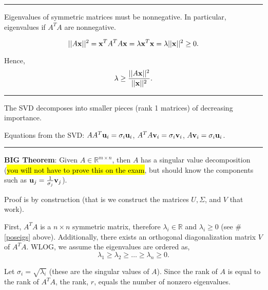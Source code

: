 \begin{questions}
\rule[0.001in]{\textwidth}{0.00025in}














\question \label{poseigs} Eigenvalues of symmetric matrices must be nonnegative.  In particular, eigenvalues if $A^TA$ are nonnegative.  

\proof   
\[ || A{\bf x} ||^2 =  {\bf x}^TA^TA {\bf x} =  \lambda {\bf x}^T {\bf x} = \lambda ||{\bf x}||^2 \ge 0. \]

Hence,  \[ \lambda \ge \frac{|| A{\bf x} ||^2 }{||{\bf x}||^2}. \]



\rule[0.001in]{\textwidth}{0.00025in}










\question The SVD decomposes into smaller pieces (rank 1 matrices) of decreasing importance.



\question Equations from the SVD: 
 $AA^T {\bf u}_i = \sigma_i {\bf u}_i$, \; 
$A^TA {\bf v}_i = \sigma_i {\bf v}_i$, \; 
$A {\bf v}_i = \sigma_i {\bf u}_i$. 




\rule[0.001in]{\textwidth}{0.00025in}





\question \textbf{BIG Theorem}: Given $A \in \mathbb{R}^{m \times n}$, then $A$ has a singular value decomposition (\hl{you will not have to prove this on the exam}, but should know the components such as ${\bf u}_j = \frac{1}{\sigma_j} {\bf v}_j$).  

\proof Proof is by construction (that is we construct the matrices $U, \Sigma$, and $V$ that  work).  

First, $A^TA$ is a $n \times n$ symmetric matrix, therefore $\lambda_i \in \mathbb{R}$ and $\lambda_i \ge 0$ (see \#\ref{poseigs} above).  Additionally, there exists an orthogonal diagonalization matrix $V$ of $A^TA$.   WLOG, we assume the eigenvalues are ordered as, 
\[ \lambda_1\ge  \lambda_2 \ge  \dots \ge  \lambda_n \ge 0. \]

Let $\sigma_i = \sqrt{\lambda_i}$ (these are the singular values of $A$).    Since the rank of $A$ is equal to the rank of $A^TA$, the rank, $r$, equals the number of nonzero eigenvalues.  %
 

\end{questions}
